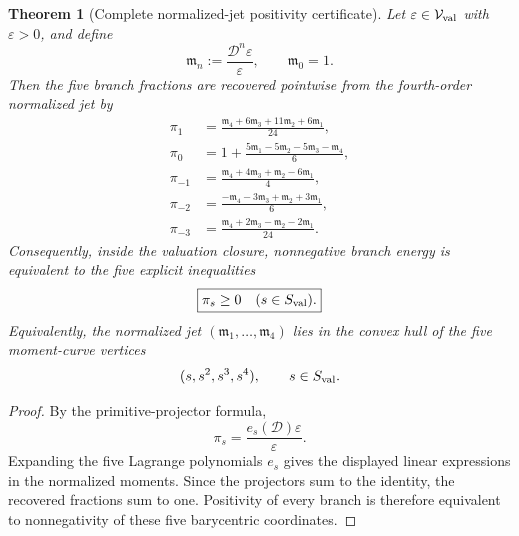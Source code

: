 \documentclass[aps,prd,reprint,onecolumn,nofootinbib,superscriptaddress,showkeys]{revtex4-2}
\numberwithin{equation}{section}
\theoremstyle{definition}
\theoremstyle{plain}
\newtheorem{theorem}{Theorem}[section]
\newcommand{\Dil}{\mathscr D}
\begin{document}
\begin{theorem}[Complete normalized-jet positivity certificate]\label{thm:jet-simplex}
Let $\varepsilon\in\mathcal V_{\rm val}$ with $\varepsilon>0$, and define
\begin{equation}
\mathfrak m_n:=\frac{\Dil^n\varepsilon}{\varepsilon},
\qquad \mathfrak m_0=1.
\end{equation}
Then the five branch fractions are recovered pointwise from the fourth-order normalized jet by
\begin{align}
\pi_{1}
&=\frac{\mathfrak m_4+6\mathfrak m_3+11\mathfrak m_2+6\mathfrak m_1}{24},\\
\pi_{0}
&=1+\frac{5\mathfrak m_1-5\mathfrak m_2-5\mathfrak m_3-\mathfrak m_4}{6},\\
\pi_{-1}
&=\frac{\mathfrak m_4+4\mathfrak m_3+\mathfrak m_2-6\mathfrak m_1}{4},\\
\pi_{-2}
&=\frac{-\mathfrak m_4-3\mathfrak m_3+\mathfrak m_2+3\mathfrak m_1}{6},\\
\pi_{-3}
&=\frac{\mathfrak m_4+2\mathfrak m_3-\mathfrak m_2-2\mathfrak m_1}{24}.
\end{align}
Consequently, inside the valuation closure, nonnegative branch energy is equivalent to the five explicit inequalities
\begin{equation}
\boxed{\pi_s\ge0\quad(s\in S_{\rm val}).}
\end{equation}
Equivalently, the normalized jet $(\mathfrak m_1,\ldots,\mathfrak m_4)$ lies in the convex hull of the five moment-curve vertices
\begin{equation}
(s,s^2,s^3,s^4),
\qquad s\in S_{\rm val}.
\end{equation}
\end{theorem}

\begin{proof}
By the primitive-projector formula,
\[
\pi_s=\frac{e_s(\Dil)\varepsilon}{\varepsilon}.
\]
Expanding the five Lagrange polynomials $e_s$ gives the displayed linear expressions in the normalized moments.  Since the projectors sum to the identity, the recovered fractions sum to one.  Positivity of every branch is therefore equivalent to nonnegativity of these five barycentric coordinates.
\end{proof}
\end{document}
